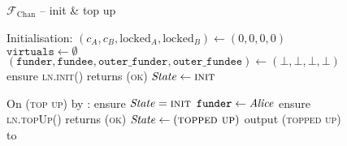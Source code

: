 \begin{figure}[H]
  \begin{systembox}{$\mathcal{F}_{\mathrm{Chan}}$ -- init \& top up}
    \begin{algorithmic}[1]
      \State Initialisation: 
      \Indent
        \State $(c_A, c_B, \mathrm{locked}_A, \mathrm{locked}_B) \gets (0, 0, 0,
        0)$
        \State $\texttt{virtuals} \gets \emptyset$
        \State $(\texttt{funder}, \texttt{fundee}, \texttt{outer\_funder},
        \texttt{outer\_fundee}) \gets (\bot, \bot, \bot, \bot)$
        \State ensure \textsc{ln.init}() returns (\textsc{ok})
        \State $\mathit{State} \gets \textsc{init}$
      \EndIndent
      \Statex

      \State On (\textsc{top up}) by \alice:
      \label{code:functionality:chan:skeleton:init:top_up:start}
      \Indent
        \State ensure $\mathit{State} = \textsc{init}$
        \State $\mathtt{funder} \gets \mathit{Alice}$
        \State ensure \textsc{ln.topUp}(\alice) returns (\textsc{ok})
        \State $\mathit{State} \gets (\textsc{topped up})$
        \State output (\textsc{topped up}) to \alice
        \label{code:functionality:chan:skeleton:init:top_up:end}
      \EndIndent
    \end{algorithmic}
  \end{systembox}
  \caption{}
  \label{code:functionality:chan:skeleton:init}
\end{figure}

